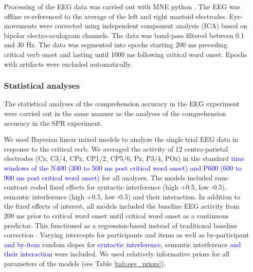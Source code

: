 \documentclass[a4paper, man, floatsintext]{apa7}
\begin{document}
Processing of the EEG data was carried out with MNE python \citep{mne}. The EEG was offline re-referenced to the average of the left and right mastoid electrodes. Eye-movements were corrected using independent component analysis (ICA) based on bipolar electro-oculogram channels. The data was band-pass filtered between 0.1 and 30 Hz. The data was segmented into epochs starting 200 ms preceding critical verb onset and lasting until 1000 ms following critical word onset. Epochs with artifacts were excluded automatically.

\subsubsection{Statistical analyses}
The statistical analyses of the comprehension accuracy in the EEG experiment were carried out in the same manner as the analyses of the comprehension accuracy in the SPR experiment.

We used Bayesian linear mixed models to analyze the single trial EEG data in response to the critical verb. We averaged the activity of 12 centro-parietal electrodes (Cz, C3/4, CPz, CP1/2, CP5/6, Pz, P3/4, POz) in the standard \textcolor{blue}{time windows of the  N400 (300 to 500 ms post critical word onset) and P600 (600 to 900 ms post critical word onset)} for all analyses. The models included sum-contrast coded fixed effects for syntactic interference (high +0.5, low -0.5), semantic interference (high +0.5, low -0.5) and their interaction. In addition to the fixed effects of interest, all models included the baseline EEG activity from 200 ms prior to critical word onset until critical word onset as a continuous predictor. This functioned as a regression-based instead of traditional baseline correction \citep{alday2019}. Varying intercepts for participants and items as well as by-participant \textcolor{blue}{and by-item} random slopes for \textcolor{blue}{syntactic interference,} semantic interference \textcolor{blue}{and their interaction} were included. We used relatively informative priors for all parameters of the models (see Table \ref{tab:eeg_priors}). 
\end{document}
